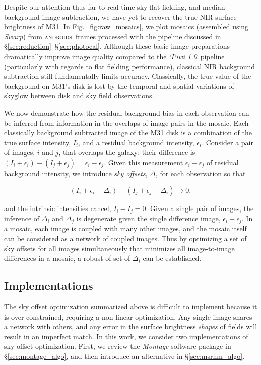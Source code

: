 \documentclass[iop]{emulateapj}
\newcommand{\sw}[1]{\textit{#1}} %
\newcommand{\iiwione}{\sw{`I`iwi 1.0}}
\newcommand{\androids}{\textsc{androids}}
\newcommand{\Fig}[1]{Fig.~\ref{fig:#1}}  %
\newcommand{\Sec}[1]{\S\ref{sec:#1}}  %
\begin{document}
Despite our attention thus far to real-time sky flat fielding, and median background image subtraction, we have yet to recover the true NIR surface brightness of M31.
In \Fig{raw_mosaics}, we plot mosaics (assembled using \sw{Swarp}) from \androids\ frames processed with the pipeline discussed in \Sec{reduction}--\Sec{photocal}.
Although these basic image preparations dramatically improve image quality compared to the \iiwione\ pipeline (particularly with regards to flat fielding performance), classical NIR background subtraction still fundamentally limits accuracy.
Classically, the true value of the background on M31's disk is lost by the temporal and spatial variations of skyglow between disk and sky field observations.

We now demonstrate how the residual background bias in each observation can be inferred from information in the overlaps of image pairs in the mosaic.
Each classically background subtracted image of the M31 disk is a combination of the true surface intensity, $I_i$, and a residual background intensity, $\epsilon_i$.
Consider a pair of images, $i$ and $j$, that overlaps the galaxy: their difference is $(I_i+\epsilon_i) - (I_j+\epsilon_j) = \epsilon_i - \epsilon_j$.
Given this measurement $\epsilon_i - \epsilon_j$ of residual background intensity, we introduce \emph{sky offsets}, $\Delta$, for each observation so that

\begin{equation}
    (I_i + \epsilon_i - \Delta_i) - (I_j + \epsilon_j - \Delta_i) \rightarrow 0,
\end{equation}

\noindent and the intrinsic intensities cancel, $I_i - I_j = 0$.
Given a single pair of images, the inference of $\Delta_i$ and $\Delta_j$ is degenerate given the single difference image, $\epsilon_i-\epsilon_j$.
In a mosaic, each image is coupled with many other images, and the mosaic itself can be considered as a network of coupled images.
Thus by optimizing a set of sky offsets for all images simultaneously that minimizes all image-to-image differences in a mosaic, a robust of set of $\Delta_i$ can be established.

\subsection{Implementations}
\label{sec:offset_algos}

The sky offset optimization summarized above is difficult to implement because it is over-constrained, requiring a non-linear optimization.
Any single image shares a network with others, and any error in the surface brightness \emph{shapes} of fields will result in an imperfect match.
In this work, we consider two implementations of sky offset optimization.
First, we review the \sw{Montage} software package in \Sec{montage_algo}, and then introduce an alternative in \Sec{msrnm_algo}.
\end{document}
